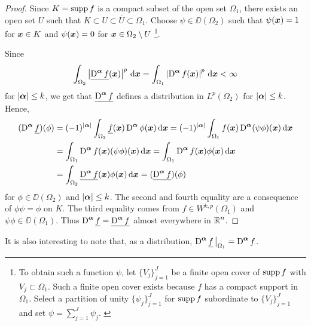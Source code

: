 \begin{proof}
Since $K = \operatorname{supp} f$ is a compact subset of the open set $\Omega_1$,
there exists an open set $U$ such that
$K \subset U \subset \overline{U} \subset \Omega_1$.
Choose $\psi \in \DD(\Omega_2)$ such that
$\psi({\bm{x}}) = 1$ for ${\bm{x}} \in K$ and $\psi({\bm{x}}) = 0$ for
${\bm{x}} \in \Omega_2 \setminus U$
\footnote{
To obtain such a function $\psi$, let $\displaystyle \{V_j\}_{j=1}^J$
be a finite open cover of $\operatorname{supp} f$ with $V_j \subset \Omega_1$.  Such a
finite open cover exists because $f$ has a compact support in
$\Omega_1$.  Select a partition of unity
$\displaystyle \{\psi_j\}_{j=1}^J$ for $\operatorname{supp} f$
subordinate to $\displaystyle \{V_j\}_{j=1}^J$ and set
$\displaystyle \psi = \sum_{j=1}^J \psi_j$. \label{FOOTNOTE1}}.

Since
\[
\int_{\Omega_2} \left|\underline{\operatorname{D}^{{\bm{\alpha}}} f}({\bm{x}})\right|^p
\,\mathrm{d}{{\bm{x}}} = 
\int_{\Omega_1} \left| \operatorname{D}^{{\bm{\alpha}}} f({\bm{x}}) \right|^p
\,\mathrm{d}{{\bm{x}}} < \infty
\]
for $|{\bm{\alpha}}|\leq k$, we get that
$\displaystyle \underline{\operatorname{D}^{{\bm{\alpha}}} f}$ defines a
distribution in $\displaystyle L^p(\Omega_2)$ for $|{\bm{\alpha}}|\leq k$.
Hence,
\begin{align*}
(\operatorname{D}^{{\bm{\alpha}}} \underline{f})(\phi)
&= (-1)^{|{\bm{\alpha}}|} \int_{\Omega_2} \underline{f}({\bm{x}})
\operatorname{D}^{{\bm{\alpha}}} \phi({\bm{x}})\,\mathrm{d}{{\bm{x}}}
= (-1)^{|{\bm{\alpha}}|} \int_{\Omega_1} f({\bm{x}})
\operatorname{D}^{{\bm{\alpha}}} (\psi \phi)({\bm{x}})\,\mathrm{d}{{\bm{x}}} \\
&= \int_{\Omega_1} \operatorname{D}^{{\bm{\alpha}}} f({\bm{x}})
(\psi \phi)({\bm{x}})\,\mathrm{d}{{\bm{x}}}
= \int_{\Omega_1} \operatorname{D}^{{\bm{\alpha}}} f({\bm{x}}) \phi({\bm{x}})\,\mathrm{d}{{\bm{x}}} \\
&= \int_{\Omega_2} \underline{\operatorname{D}^{{\bm{\alpha}}} f}({\bm{x}})
\phi({\bm{x}})\,\mathrm{d}{{\bm{x}}}
= (\underline{\operatorname{D}^{{\bm{\alpha}}} f}) (\phi)
\end{align*}
for $\phi \in \DD(\Omega_2)$ and $|{\bm{\alpha}}|\leq k$.  The second and fourth
equality are a consequence of $\phi \psi = \phi$ on $K$.  The third
equality comes from $\displaystyle f \in W^{k,p}(\Omega_1)$ and
$\psi \phi \in \DD(\Omega_1)$.
Thus $\displaystyle \operatorname{D}^{{\bm{\alpha}}} \underline{f}
= \underline{\operatorname{D}^{{\bm{\alpha}}} f}$
almost everywhere in $\displaystyle \mathbb{R}^n$.
\end{proof}

It is also interesting to note that, as a distribution,
$\displaystyle \operatorname{D}^{{\bm{\alpha}}} \underline{f}\,\big|_{\Omega_1}
= \operatorname{D}^{{\bm{\alpha}}} f$.

